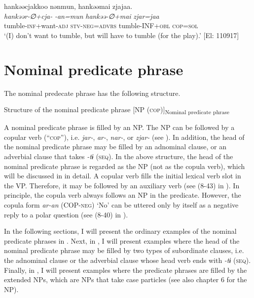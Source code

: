 \ex \label{ex:9.50b} %
    \glll  hankəəcjakkoo  nənmun,  hankəəmai  zjajaa.\\
      \textit{hankəər-∅+cja-}  \textit{-an=mun}  \textit{hankəə-∅+mai}  \textit{zjar=jaa}\\
      tumble-\textsc{inf}+want-\textsc{adj}  \textsc{stv}-\textsc{neg}=\textsc{advrs}  tumble-INF+\textsc{obl}  \textsc{cop}=\textsc{sol}\\
      \glt       ‘(I) don’t want to tumble, but will have to tumble (for the play).’ [El: 110917]
    \z
\z

\section{Nominal predicate phrase}\label{sec:9.3}

The nominal predecate phrase has the following structure.

\ea   Structure of the nominal predicate phrase \label{ex:9.51}
  [NP \hspace{\tabcolsep} (\textsc{cop})]\textsubscript{Nominal predicate phrase}
\z

A nominal predicate phrase is filled by an NP. The NP can be followed by a copular verb (“\textsc{cop}”), i.e. \textit{jar-}, \textit{ar-}, \textit{nar-}, or \textit{zjar-} (see ). In addition, the head of the nominal predicate phrase may be filled by an adnominal clause, or an adverbial clause that takes \textit{{}-tɨ} (\textsc{seq}). In the above structure, the head of the nominal predicate phrase is regarded as the NP (not as the copula verb), which will be discussed in  in detail. A copular verb fills the initial lexical verb slot in the VP. Therefore, it may be followed by an auxiliary verb (see (8-43) in ). In principle, the copula verb always follows an NP in the predicate. However, the copula form \textit{ar-an} (COP-\textsc{neg}) ‘No’ can be uttered only by itself as a negative reply to a polar question (see (8-40) in ).

In the following sections, I will present the ordinary examples of the nominal predicate phrases in . Next, in , I will present examples where the head of the nominal predicate phrase may be filled by two types of subordinate clauses, i.e. the adnominal clause or the adverbial clause whose head verb ends with \textit{{}-tɨ} (\textsc{seq}). Finally, in , I will present examples where the predicate phrases are filled by the extended NPs, which are NPs that take case particles (see also chapter 6 for the NP).

